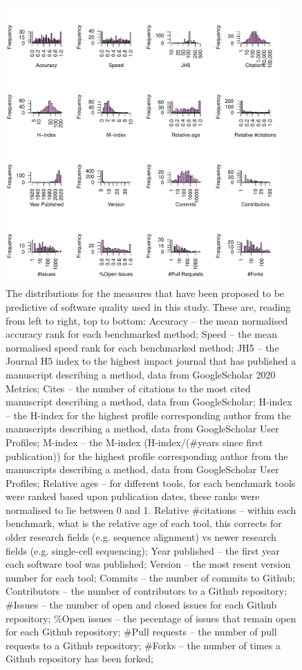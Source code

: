 \documentclass[fleqn,10pt]{SelfArx} %
\begin{document}
\begin{figure}[htb!]
\centering
\includegraphics[width=0.95\textwidth]{supplementary-figures-small.pdf}
\caption{The distributions for the measures that have been proposed to be
predictive of software quality used in this study. These
are, reading from left to right, top to bottom:
Accuracy -- the mean normalised accuracy rank for each benchmarked method;
Speed -- the mean normalised speed rank for each benchmarked method;
JH5 -- the Journal H5 index to the highest impact journal that has published a manuscript describing a method, data from GoogleScholar 2020 Metrics;
Cites -- the number of citations to the most cited manuscript describing a method, data from GoogleScholar;
H-index -- the H-index for the highest profile corresponding author from the manuscripts describing a method, data from GoogleScholar User Profiles;
M-index -- the M-index (H-index/(\#years since first publication)) for the highest profile corresponding author from the manuscripts describing a method, data from GoogleScholar User Profiles;
Relative ages -- for different tools, for each benchmark tools were ranked based upon publication dates, these ranks were normalised to lie between 0 and 1.
Relative \#citations -- within each benchmark, what is the relative age of each tool, this corrects for older research fields (e.g. sequence alignment) vs newer research fields (e.g. single-cell sequencing);
Year published -- the first year each software tool was published;
Version -- the most resent version number for each tool;
Commits -- the number of commits to Github;
Contributors -- the number of contributors to a Github repository;
\#Issues -- the number of open and closed issues for each Github repository;
\%Open issues -- the pecentage of issues that remain open for each Github repository;
\#Pull requests -- the number of pull requests to a Github repository;
\#Forks -- the number of times a Github repository has been forked;
}
\label{fig:metricDistributions}
\end{figure}
\end{document}
